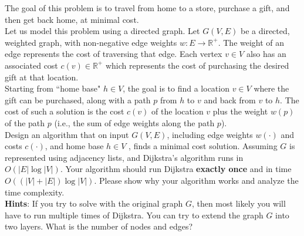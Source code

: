 \noindent {} 
The goal of this problem is to travel from home to a store, purchase a gift, and then get back home, at minimal cost. \\
Let us model this problem using a directed graph. Let $G(V, E)$ be a directed, weighted graph, with non-negative edge weights $w: E \rightarrow \mathbb{R}^{+}$. The weight of an edge represents the cost of traversing that edge. Each vertex $v \in V$ also has an associated cost $c(v) \in \mathbb{R}^{+}$ which represents the cost of purchasing the desired gift at that location. \\
Starting from ``home base" $h \in V$, the goal is to find a location $v \in V$ where the gift can be purchased, along with a path $p$ from $h$ to $v$ and back from $v$ to $h$. The cost of such a solution is the cost $c(v)$ of the location $v$ plus the weight $w(p)$ of the path $p$ (i.e., the sum of edge weights along the path $p$). \\
Design an algorithm that on input $G(V, E)$, including edge weights $w(\cdot)$ and costs $c(\cdot)$, and home base $h \in V$ , finds a minimal cost solution. Assuming $G$ is represented using adjacency lists, and Dijkstra's algorithm runs in $O(|E| \log |V |)$. Your algorithm should run Dijkstra \textbf{exactly once} and in time $O((|V |+ |E|) \log |V|)$. Please show why your algorithm works and analyze the time complexity. \\
\textbf{Hints}: If you try to solve with the original graph $G$, then most likely you will have to run multiple times of Dijkstra. You can try to extend the graph $G$ into two layers. What is the number of nodes and edges?
